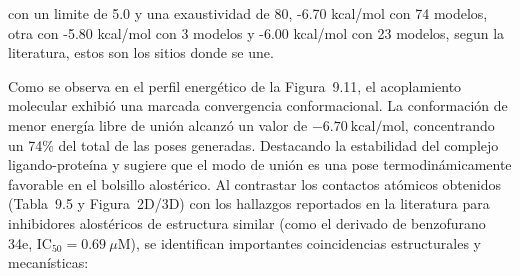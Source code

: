 con un limite de 5.0 y una exaustividad de 80, -6.70 kcal/mol con 74 modelos, otra con -5.80 kcal/mol con 3 modelos y -6.00 kcal/mol con 23 modelos, segun la literatura, estos son los sitios donde se une. 

Como se observa en el perfil energético de la Figura~9.11, el acoplamiento molecular exhibió una marcada convergencia conformacional. La conformación de menor energía libre de unión alcanzó un valor de $-6.70\ \text{kcal/mol}$, concentrando un 74\% del total de las poses generadas. Destacando la estabilidad del complejo ligando-proteína y sugiere que el modo de unión es una pose termodinámicamente favorable en el bolsillo alostérico.
Al contrastar los contactos atómicos obtenidos (Tabla~9.5 y Figura~2D/3D) con los hallazgos reportados en la literatura para inhibidores alostéricos de estructura similar (como el derivado de benzofurano 34e, $\text{IC}_{50} = 0.69\ \mu\text{M}$), se identifican importantes coincidencias estructurales y mecanísticas:

